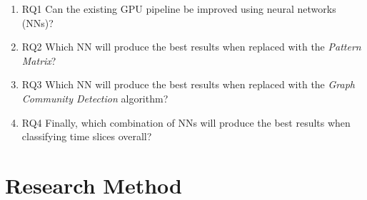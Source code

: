 \begin{enumerate}
  \item{RQ1} Can the existing GPU pipeline be improved using neural networks (NNs)?
  \item{RQ2} Which NN will produce the best results when replaced with the \emph{Pattern Matrix}?
  \item{RQ3} Which NN will produce the best results when replaced with the \emph{Graph Community Detection} algorithm?
  \item{RQ4} Finally, which combination of NNs will produce the best results when classifying time slices overall?
\end{enumerate}

\section{Research Method}
